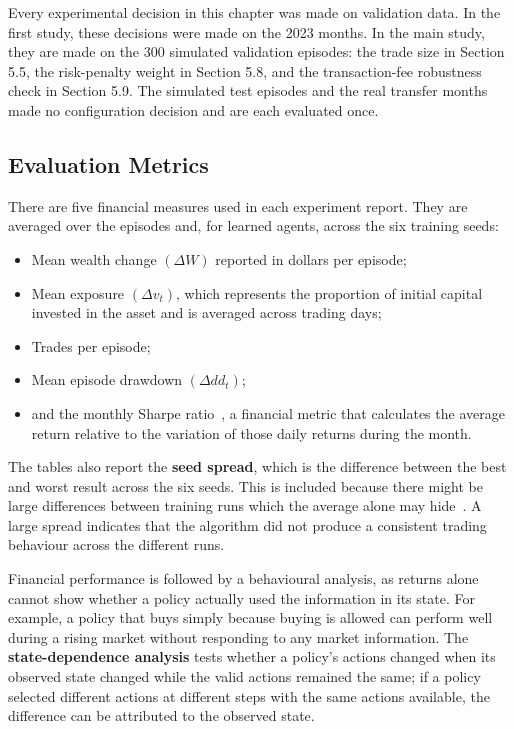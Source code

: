 Every experimental decision in this chapter was made on validation data.
In the first study, these decisions were made on the 2023 months. In the
main study, they are made on the 300 simulated validation episodes: the trade size
in Section 5.5, the risk-penalty weight in Section 5.8, and the
transaction-fee robustness check in Section 5.9. The simulated test
episodes and the real transfer months made no configuration decision and
are each evaluated once.

\subsection{Evaluation Metrics}

There are five financial measures used in each experiment report. They
are averaged over the episodes and, for learned agents, across the six
training seeds:

\begin{itemize}
\item
  Mean wealth change \((\Delta W)\) reported in dollars per episode;
\item
  Mean exposure \((\Delta v_{t})\), which represents the proportion of
  initial capital invested in the asset and is averaged across trading
  days;
\item
  Trades per episode;
\item
  Mean episode drawdown \((\Delta{dd}_{t})\);
\item
  and the monthly Sharpe ratio~\cite{sharpe1994}, a financial metric that calculates the
  average return relative to the variation of those daily returns during
  the month.
\end{itemize}

The tables also report the \textbf{seed spread}, which is the difference
between the best and worst result across the six seeds. This is included
because there might be large differences between training runs which the
average alone may hide~\cite{henderson2018}. A large spread indicates that the algorithm did
not produce a consistent trading behaviour across the different runs.

Financial performance is followed by a behavioural analysis, as returns
alone cannot show whether a policy actually used the information in its
state. For example, a policy that buys simply because buying is allowed
can perform well during a rising market without responding to any market
information. The \textbf{state-dependence analysis} tests whether a
policy's actions changed when its observed state changed while the valid
actions remained the same; if a policy selected different actions at
different steps with the same actions available, the difference can be
attributed to the observed state.

